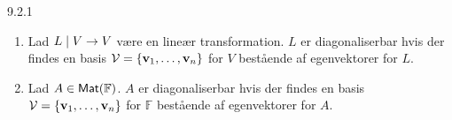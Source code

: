 %
%

\begin{definition}{9.2.1}
	\begin{enumerate}
		\item Lad $L \mid V \rightarrow V$ være en lineær transformation. $L$ er
			diagonaliserbar hvis der findes en basis $\mathcal{V} = \{ \mathbf{v}_1, \dotsc,
			\mathbf{v}_n \}$ for $V$ bestående af egenvektorer for $L$.
		\item Lad $A \in \textsf{Mat}(\mathbb{F})$. $A$ er diagonaliserbar hvis der
			findes en basis $\mathcal{V} = \{ \mathbf{v}_1, \dotsc, \mathbf{v}_n \}$ for $\mathbb{F}$
			bestående af egenvektorer for $A$.
	\end{enumerate}
\end{definition}
